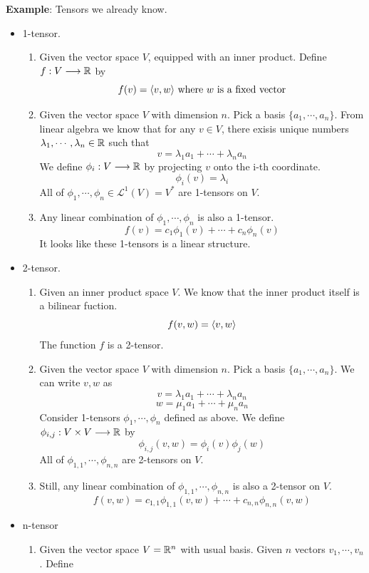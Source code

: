 \noindent\textbf{Example}: Tensors we already know.
\begin{itemize}
    \item 1-tensor.
    \begin{enumerate}
        \item Given the vector space $V$, equipped with an inner product. Define $f:V\longrightarrow\mathbb{R}$ by 
        $$f(v)=\langle v, w \rangle\text{ where $w$ is a fixed vector}$$
        \item Given the vector space $V$ with dimension $n$. Pick a basis $\{a_1,\cdots,a_n\}$. From linear algebra we know that for any $v\in V$, there exisis unique numbers $\lambda_1,\cdots,\lambda_n\in \mathbb{R}$ such that 
        $$v=\lambda_1a_1+\cdots+\lambda_na_n$$
        We define $\phi_i:V\longrightarrow\mathbb{R}$ by projecting $v$ onto the i-th coordinate.
        $$\phi_i(v)=\lambda_i$$
        All of $\phi_1,\cdots,\phi_n\in\mathcal{L}^1(V)=V^*$ are 1-tensors on $V$.
        \item Any linear combination of $\phi_1,\cdots,\phi_n$ is also a 1-tensor.
        $$f(v)=c_1\phi_1(v)+\cdots+c_n\phi_n(v)$$
        It looks like these 1-tensors is a linear structure.
    \end{enumerate}
    \item 2-tensor.
    \begin{enumerate}
        \item Given an inner product space $V$. We know that the inner product itself is a bilinear fuction. 
        $$f(v,w)=\langle v, w \rangle$$
        The function $f$ is a 2-tensor.
        \item Given the vector space $V$ with dimension $n$. Pick a basis $\{a_1,\cdots,a_n\}$. We can write $v,w$ as 
        $$v=\lambda_1a_1+\cdots+\lambda_na_n$$
        $$w=\mu_1a_1+\cdots+\mu_na_n$$
        Consider 1-tensors $\phi_1,\cdots,\phi_n$ defined as above. We define $\phi_{i,j}:V\times V\longrightarrow\mathbb{R}$ by 
        $$\phi_{i,j}(v,w)=\phi_i(v)\phi_j(w)$$
        All of $\phi_{1,1},\cdots,\phi_{n,n}$ are 2-tensors on $V$.
        \item Still, any linear combination of $\phi_{1,1},\cdots,\phi_{n,n}$ is also a 2-tensor on $V$.
        $$f(v,w)=c_{1,1}\phi_{1,1}(v,w)+\cdots+c_{n,n}\phi_{n,n}(v,w)$$
    \end{enumerate}
    \item n-tensor
    \begin{enumerate}
        \item Given the vector space $V=\mathbb{R}^n$ with usual basis. Given $n$ vectors $v_1,\cdots,v_n$. Define

\end{enumerate}
\end{itemize}
